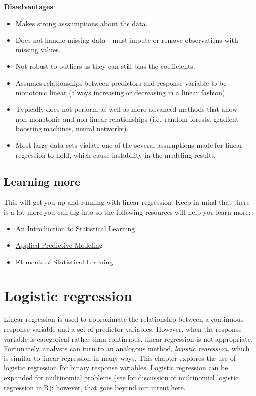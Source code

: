 \documentclass[]{book}
\providecommand{\tightlist}{%
  \setlength{\itemsep}{0pt}\setlength{\parskip}{0pt}}
\theoremstyle{definition}
\theoremstyle{definition}
\theoremstyle{definition}
\theoremstyle{remark}
\begin{document}
\textbf{Disadvantages}:

\begin{itemize}
\tightlist
\item
  Makes strong asssumptions about the data.
\item
  Does not handle missing data - must impute or remove observations with
  missing values.
\item
  Not robust to outliers as they can still bias the coefficients.
\item
  Assumes relationships between predictors and response variable to be
  monotonic linear (always increasing or decreasing in a linear
  fashion).
\item
  Typically does not perform as well as more advanced methods that allow
  non-monotonic and non-linear relationships (i.e.~random forests,
  gradient boosting machines, neural networks).
\item
  Most large data sets violate one of the several assumptions made for
  linear regression to hold, which cause instability in the modeling
  results.
\end{itemize}

\hypertarget{learning-more}{%
\section{Learning more}\label{learning-more}}

This will get you up and running with linear regression. Keep in mind
that there is a lot more you can dig into so the following resources
will help you learn more:

\begin{itemize}
\tightlist
\item
  \href{http://www-bcf.usc.edu/~gareth/ISL/}{An Introduction to
  Statistical Learning}
\item
  \href{http://appliedpredictivemodeling.com/}{Applied Predictive
  Modeling}
\item
  \href{https://statweb.stanford.edu/~tibs/ElemStatLearn/}{Elements of
  Statistical Learning}
\end{itemize}

\hypertarget{logistic-regression}{%
\chapter{Logistic regression}\label{logistic-regression}}

Linear regression is used to approximate the relationship between a
continuous response variable and a set of predictor variables. However,
when the response variable is categorical rather than continuous, linear
regression is not appropriate. Fortunately, analysts can turn to an
analogous method, \emph{logistic regression}, which is similar to linear
regression in many ways. This chapter explores the use of logistic
regression for binary response variables. Logistic regression can be
expanded for multinomial problems (see \citet{faraway2016extending} for
discussion of multinomial logistic regression in R); however, that goes
beyond our intent here.
\end{document}

